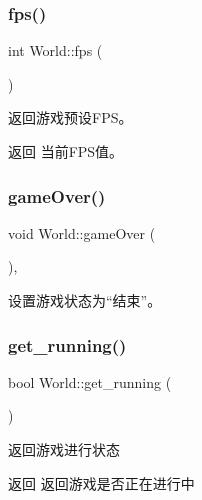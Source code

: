 \subsubsection{\texorpdfstring{fps()}{fps()}}
{\footnotesize\ttfamily int World\+::fps (\begin{DoxyParamCaption}{ }\end{DoxyParamCaption})}



返回游戏预设\+F\+P\+S。 

\begin{DoxyReturn}{返回}
当前\+F\+P\+S值。 
\end{DoxyReturn}
\mbox{\label{class_world_a699c52e5991e939402c6c7396c3e931a}} 
\subsubsection{\texorpdfstring{game\+Over()}{gameOver()}}
{\footnotesize\ttfamily void World\+::game\+Over (\begin{DoxyParamCaption}{ }\end{DoxyParamCaption})\hspace{0.3cm}{\ttfamily [inline]}, {\ttfamily [private]}}



设置游戏状态为“结束”。 

\mbox{\label{class_world_a485fb0b11ed568979df0b6f782aa3ac8}} 
\subsubsection{\texorpdfstring{get\+\_\+running()}{get\_running()}}
{\footnotesize\ttfamily bool World\+::get\+\_\+running (\begin{DoxyParamCaption}{ }\end{DoxyParamCaption})}



返回游戏进行状态 

\begin{DoxyReturn}{返回}
返回游戏是否正在进行中 
\end{DoxyReturn}
\mbox{\label{class_world_ae75511e9504917690bc4ab1421cff6d5}} 
